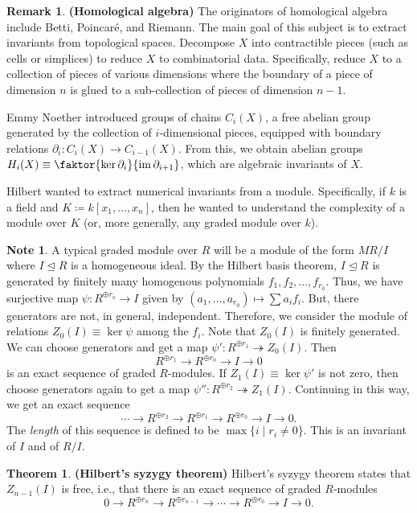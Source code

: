 \documentclass[10pt,letterpaper,cm]{nupset}
\theoremstyle{definition}
\newtheorem{note}{Note}
\newtheorem{remark}{Remark}
\newtheorem{theorem}{Theorem}
\newcommand{\1}{\mathbf{1}}
\newcommand{\0}{\vec 0}
\DeclareMathOperator{\im}{im}
\begin{document}
\begin{remark}{\textbf{(Homological algebra)}}
The originators of homological algebra include Betti, Poincar\'e, and Riemann. The main goal of this subject is to extract invariants from topological spaces. Decompose $X$ into contractible pieces (such as cells or simplices) to reduce $X$ to combinatorial data. Specifically, reduce $X$ to a collection of pieces of various dimensions where the boundary of a piece of dimension $n$ is glued to a sub-collection of pieces of dimension $n-1$. 

Emmy Noether introduced groups of chains $C_i(X)$, a free abelian group generated by the collection of $i$-dimensional pieces, equipped with boundary relations $\partial_i : C_i(X) \to C_{i-1}(X)$. From this, we obtain abelian groups $H_i(X)\equiv \faktor{\ker{\partial_i}}{\im{\partial_{i+1}}}$, which are algebraic invariants of $X$. 

Hilbert wanted to extract numerical invariants from a module. Specifically, if $k$ is a field and $K\coloneqq  k[x_1, \ldots, x_n]$, then he wanted to understand the complexity of a module over $K$ (or, more generally, any graded module  over $k$).
\end{remark}

\begin{note}
A typical graded module over $R$ will be a module of the form $M R/I$ where $I \unlhd R$ is a homogeneous ideal. By the Hilbert basis theorem, $I \unlhd R$ is generated by finitely many homogenous polynomials $f_1, f_2, \ldots, f_{r_0}$. Thus, we have surjective map $\psi: R^{\oplus r_o} \to I $ given by $(a_1, \ldots, a_{r_0}) \mapsto \sum a_if_i$. But, there generators are not, in general, independent. Therefore, we consider the module of relations $Z_0(I) \equiv \ker{\psi}$ among the $f_i$. Note that $Z_0(I)$ is finitely generated. We can choose generators and get a map $\psi': R^{\oplus r_1} \twoheadrightarrow Z_0(I)$. Then $$R^{\oplus r_1} \to R^{\oplus r_0} \to I \to 0$$ is an exact sequence of graded $R$-modules. If $Z_1(I) \equiv \ker{\psi'}$ is not zero, then choose generators again to get a map $\psi'': R^{\oplus r_2} \twoheadrightarrow Z_1(I)$. Continuing in this way, we get an exact sequence $$\cdots \to R^{\oplus r_2} \to R^{\oplus r_1} \to R^{\oplus r_0} \to I \to 0.$$ The \textit{length} of this sequence is defined to be $\max\{i \mid r_i \ne 0\}$. This is an invariant of $I$ and of $R/I$.
\end{note}

\begin{theorem}{\textbf{(Hilbert's syzygy theorem)}}
Hilbert's syzygy theorem states that $Z_{n-1}(I)$ is free, i.e., that there is an exact sequence of graded $R$-modules $$0 \to R^{\oplus r_n} \to R^{\oplus r_{n-1}} \to \cdots \to R^{\oplus r_0} \to I \to 0.$$
\end{theorem}
\end{document}
